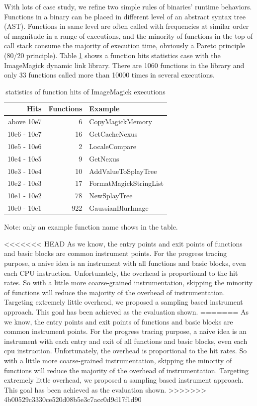 With lots of case study, we refine two simple rules of binaries' runtime behaviors. Functions in a binary can be placed in different level of an abstract syntax tree (AST). Functions in same level are often called with frequencies at similar order of magnitude in a range of executions, and the minority of functions in the top of call stack consume the majority of execution time, obviously a Pareto principle (80/20 principle). Table \ref{table:inst-stats} shows a function hits statistics case with the ImageMagick dynamic link library. There are 1060 functions in the library and only 33 functions called more than 10000 times in several executions.

 \begin{table}[h]
\caption{statistics of function hits of ImageMagick executions}
\label{table:inst-stats}
\begin{center}
\begin{tabular}{r|r|l}
\hline
Hits & Functions & Example \\
\hline
above  10e7 & 6 & CopyMagickMemory \\
10e6 - 10e7 & 16 & GetCacheNexus \\
10e5 - 10e6 & 2 & LocaleCompare \\
10e4 - 10e5 & 9 & GetNexus \\
10e3 - 10e4 & 10 & AddValueToSplayTree \\
10e2 - 10e3 & 17 & FormatMagickStringList \\
10e1 - 10e2 & 78 & NewSplayTree \\
10e0 - 10e1 & 922 & GaussianBlurImage \\
\hline
\end{tabular}
\end{center}
Note: only an example function name shows in the table.
\end{table}

<<<<<<< HEAD
As we know, the entry points and exit points of functions and basic blocks are common instrument points. For the progress tracing purpose, a naive idea is an instrument with all functions and basic blocks, even each CPU instruction. Unfortunately, the overhead is proportional to the hit rates. So with a little more coarse-grained instrumentation, skipping the minority of functions will reduce the majority of the overhead of instrumentation. Targeting extremely little overhead, we proposed a sampling based instrument approach. This goal has been achieved as the evaluation shown.
=======
As we know, the entry points and exit points of functions and basic blocks are common instrument points. For the progress tracing purpose, a naive idea is an instrument with each entry and exit of all functions and basic blocks, even each cpu instruction. Unfortunately, the overhead is proportional to the hit rates. So with a little more coarse-grained instrumentation, skipping the minority of functions will reduce the majority of the overhead of instrumentation. Targeting extremely little overhead, we proposed a sampling based instrument approach. This goal has been achieved as the evaluation shown.
>>>>>>> 4b00529c3330ce520d08b5e3c7acc0d9d17f1d90

